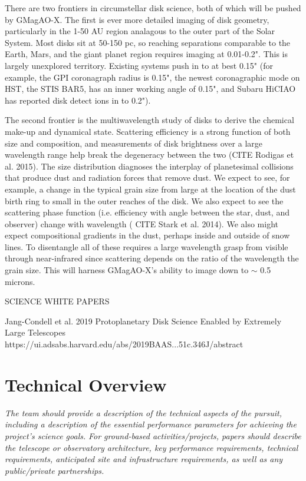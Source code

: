 \documentclass[12pt,preprint]{aastex}
\begin{document}
There are two frontiers in circumstellar disk science, both of which will be
pushed by GMagAO-X. The first is ever more detailed imaging of disk geometry,
particularly in the 1-50 AU region analagous to the outer part of the Solar
System. Most disks sit at 50-150 pc, so reaching separations comparable to the Earth, Mars, and the giant
planet region requires imaging at 0.01-0.2". This is largely unexplored
territory. Existing systems push in to at best 0.15" (for example, the GPI
coronagraph radius is 0.15", the newest coronagraphic mode on HST, the STIS
BAR5, has an inner working angle of 0.15", and Subaru HiCIAO has reported disk
detect ions in to 0.2").  

The second frontier is the multiwavelength study of disks to derive the
chemical make-up and dynamical state.  Scattering efficiency is a strong
function of both size and composition, and measurements of disk brightness
over a large wavelength range help break the degeneracy between the two
(CITE Rodigas et al. 2015). The size distribution diagnoses the interplay of
planetesimal collisions that produce dust and radiation forces that remove
dust. We expect to see, for example, a change in the typical grain size from
large at the location of the dust birth ring to small in the outer reaches of
the disk. We also expect to see the scattering phase function (i.e. efficiency
with angle between the star, dust, and observer) change with wavelength ( CITE Stark
et al. 2014). We also might expect compositional gradients in the dust,
perhaps inside and outside of snow lines. To disentangle all of these requires
a large wavelength grasp from visible through near-infrared since scattering
depends on the ratio of the wavelength the grain size. This will harness GMagAO-X's ability to
image down to $\sim$ 0.5 microns.

SCIENCE WHITE PAPERS

Jang-Condell et al. 2019 Protoplanetary Disk Science Enabled by Extremely Large Telescopes
\\https://ui.adsabs.harvard.edu/abs/2019BAAS...51c.346J/abstract\\


\section{Technical Overview}
\textit{The team should provide a description of the technical aspects of the
pursuit, including a description of the essential performance parameters for achieving the
project's science goals.}
\textit{For ground-based activities/projects, papers should describe the telescope or
observatory architecture, key performance requirements, technical requirements,
anticipated site and infrastructure requirements, as well as any public/private
partnerships.}
\end{document}
